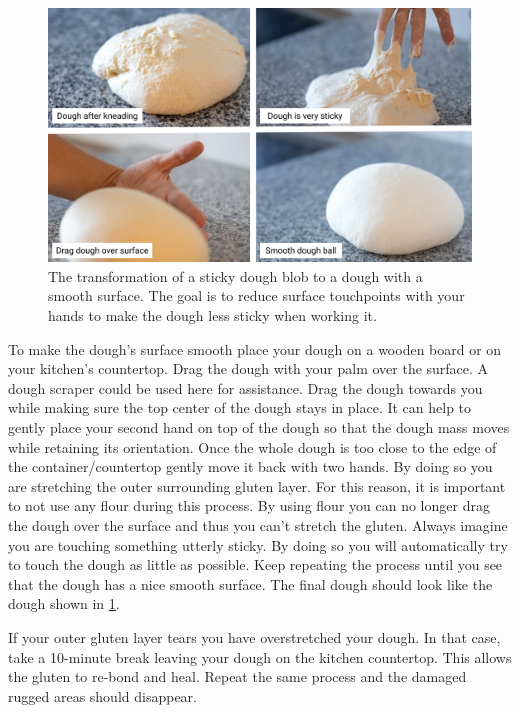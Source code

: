 \begin{figure}[!htb]
  \includegraphics[width=\textwidth]{dough-ball-steps}
  \caption{The transformation of a sticky dough blob to a dough
  with a smooth surface. The goal is to reduce surface touchpoints
  with your hands to make the dough less sticky when working it.
  }
  \label{fig:dough-ball-steps}
\end{figure}


To make the dough's surface smooth place your dough on a wooden board or
on your kitchen's countertop. Drag the dough with your palm over the surface.
A dough scraper could be used here for assistance.
Drag the dough towards you while making sure the top center of the dough stays in place.
It can help to gently place your second hand on top of the dough so that
the dough mass moves while retaining its orientation. Once the whole dough
is too close to the edge of the container/countertop gently move it back
with two hands. By doing so you are stretching the outer surrounding gluten layer.
For this reason, it is important to not use any flour during this process.
By using flour you can no longer drag the dough over the surface and thus
you can't stretch the gluten. Always imagine you are touching something utterly sticky.
By doing so you will automatically try to touch the dough as little
as possible. Keep repeating the process until you see that the dough
has a nice smooth surface. The final dough should look like the dough
shown in \ref{fig:dough-ball-steps}.

If your outer gluten layer tears you have overstretched your dough. In
that case, take a 10-minute break leaving your dough on the kitchen countertop.
This allows the gluten to re-bond and heal. Repeat the same process
and the damaged rugged areas should disappear.

